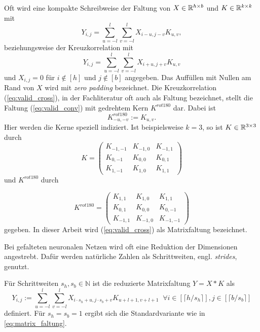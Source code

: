 \begin{bem}
    \label{bem:K_conv_komp}
    Oft wird eine kompakte Schreibweise der Faltung von $X \in \mathbb{R}^{h \times b}$ und $ K \in \mathbb{R}^{k \times k}$ mit 
    \begin{equation}
        \label{eq:valid_conv}
        Y_{i,j}=\sum_{u=-l}^l \sum_{v=-l}^l X_{i-u,j-v}K_{u,v},
    \end{equation} beziehungsweise der Kreuzkorrelation mit
    \begin{equation}
        \label{eq:valid_cross}
        Y_{i,j}=\sum_{u=-l}^l \sum_{v=-l}^l X_{i+u,j+v}K_{u,v}
    \end{equation}
    und $X_{i,j}=0$ für $i \notin [h]$ und $j \notin [b]$ angegeben. Das Auffüllen mit Nullen am Rand von $X$ wird mit \textit{zero padding} bezeichnet. Die Kreuzkorrelation (\ref{eq:valid_cross}), in der Fachliteratur oft auch als Faltung bezeichnet, stellt die Faltung (\ref{eq:valid_conv}) mit gedrehtem Kern $K^{rot180}$ dar. Dabei ist 
    \begin{equation*}
        K^{rot180}_{-u,-v}:=K_{u,v}.
    \end{equation*}
    Hier werden die Kerne speziell indiziert. Ist beispielsweise $k=3$, so ist $K \in \mathbb{R}^{3 \times 3}$ durch
    \begin{equation*}
        K=\begin{pmatrix}
            K_{-1,-1} &K_{-1,0} &K_{-1,1} \\
            K_{0,-1} &K_{0,0} &K_{0,1}  \\
            K_{1,-1} &K_{1,0} &K_{1,1} 
        \end{pmatrix}
    \end{equation*} und $K^{rot180}$ durch

    \begin{equation*}
        K^{rot180}=\begin{pmatrix}
            K_{1,1} &K_{1,0} &K_{1,1} \\
            K_{0,1} &K_{0,0} &K_{0,-1}  \\
            K_{-1,1} &K_{-1,0} &K_{-1,-1} 
        \end{pmatrix}
    \end{equation*}
    gegeben. In dieser Arbeit wird (\ref{eq:valid_cross}) als Matrixfaltung bezeichnet.
\end{bem}

Bei gefalteten neuronalen Netzen wird oft eine Reduktion der Dimensionen angestrebt. Dafür werden natürliche Zahlen als Schrittweiten, engl. \textit{strides}, genutzt.
\begin{bem}\label{bem_strides}
    Für Schrittweiten $s_h, s_b \in \mathbb{N}$ ist die reduzierte Matrixfaltung $Y=X \ast K$ als
    \begin{equation*}
        Y_{i,j}:=\sum_{u=-l}^{l} \sum_{v=-l}^{l} X_{i \cdot s_h +u,j \cdot s_b +v} K_{u+l+1, v+l+1}\; \; \forall i \in [\lceil h/s_h \rceil], j \in [\lceil b/s_b \rceil]
    \end{equation*}
    definiert.
    Für $s_h=s_b=1$ ergibt sich die Standardvariante wie in \ref{eq:matrix_faltung}.
    \end{bem}

